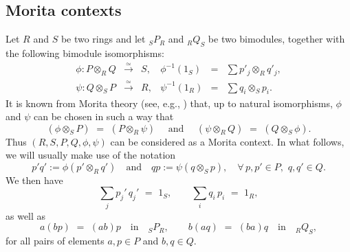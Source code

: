 \documentclass[reqno, a4paper, 10pt]{amsart}
\numberwithin{equation}{section}
\theoremstyle{plain}
\theoremstyle{definition}
\theoremstyle{remark}
\begin{document}
\subsection{Morita contexts}
\label{ssec: context}
Let $R$ and $S$ be two rings and let ${}_SP_R$ and ${}_RQ_S$ be two bimodules, together with the following bimodule isomorphisms:
\begin{equation}\label{Eq: Morita maps}
\begin{array}{rclrcl}
\phi: P \otimes_{{\scriptscriptstyle{R}}} Q &{\overset{\simeq}{\longrightarrow}}& S, & \phi^{-1}(1_{{\scriptscriptstyle{S}}}) &=& \sum p'_j \otimes_{{\scriptscriptstyle{R}}} q'_j, \\
\psi: Q \otimes_{{\scriptscriptstyle{S}}} P &{\overset{\simeq}{\longrightarrow}}& R, & \psi^{-1}(1_{{\scriptscriptstyle{R}}}) &=& \sum q_i \otimes_{{\scriptscriptstyle{S}}} p_i.
\end{array}
\end{equation}
It is known from Morita theory (see, e.g., \cite[p.\ 60]{Bas:AKT}) that, up to natural isomorphisms, $\phi$ and $\psi$ can be chosen in such a way that 
\begin{equation}
\label{energiaproxima}
(\phi{\otimes_{\scriptscriptstyle{{S}}}}P) \,\,=\,\, (P{\otimes_{\scriptscriptstyle{{R}}}}\psi) \quad \text{ and } \quad
(\psi{\otimes_{\scriptscriptstyle{{R}}}}Q) \,\,=\,\, (Q{\otimes_{\scriptscriptstyle{{S}}}}\phi).
\end{equation}
Thus $(R,S,P,Q,\phi,\psi)$ can be considered as a Morita context. In what follows, 
we will usually make use of the notation
$$
p'q' := \phi(p' \otimes_{{\scriptscriptstyle{R}}} q')  \quad \mbox{and} \quad qp := \psi(q \otimes_{{\scriptscriptstyle{S}}} p),\quad \forall \, p,p' \in P,\,\, q,q' \in Q.
$$
We then have 
$$
\sum_{j} p_j' \, q_j' \,\,=\,\, 1_S, \quad \quad \sum_{i} q_i \, p_i \,\,=\,\, 1_R,
$$
as well as
$$
a(bp) \,\,=\,\, (ab)p \quad \mbox{in} \quad {}_SP_R, \quad \quad
b(aq) \,\,=\,\, (ba) q \quad \mbox{in} \quad {}_RQ_S,
$$
for all pairs of elements $a, p \in P$ and $b,q \in Q$.
\end{document}
